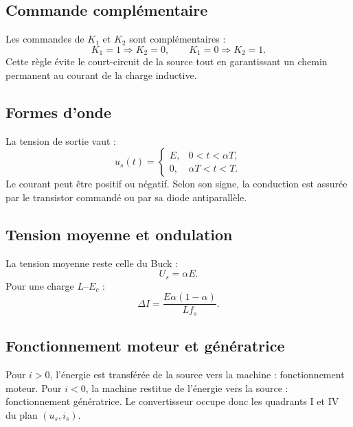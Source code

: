 \begin{center}\TLHacheurDeuxQuadrants\end{center}

\subsection{Commande complémentaire}
Les commandes de $K_1$ et $K_2$ sont complémentaires :
\[
K_1=1\Longrightarrow K_2=0,
\qquad
K_1=0\Longrightarrow K_2=1.
\]
Cette règle évite le court-circuit de la source tout en garantissant un chemin permanent au courant de la charge inductive.

\subsection{Formes d'onde}
La tension de sortie vaut :
\[
u_s(t)=
\begin{cases}
E,&0<t<\alpha T,\\
0,&\alpha T<t<T.
\end{cases}
\]
Le courant peut être positif ou négatif. Selon son signe, la conduction est assurée par le transistor commandé ou par sa diode antiparallèle.

\begin{center}
\end{center}

\subsection{Tension moyenne et ondulation}
La tension moyenne reste celle du Buck :
\[
\boxed{U_s=\alpha E}.
\]
Pour une charge $L$--$E_c$ :
\[
\boxed{\Delta I=\frac{E\alpha(1-\alpha)}{Lf_s}}.
\]

\subsection{Fonctionnement moteur et génératrice}
Pour $i>0$, l'énergie est transférée de la source vers la machine : fonctionnement moteur. Pour $i<0$, la machine restitue de l'énergie vers la source : fonctionnement génératrice. Le convertisseur occupe donc les quadrants I et IV du plan $(u_s,i_s)$.

